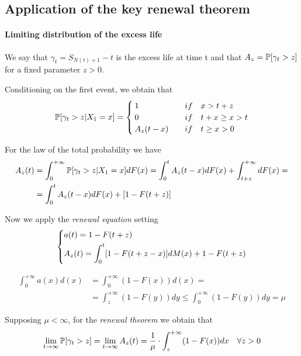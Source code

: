 \subsection{Application of the key renewal theorem}

\paragraph{Limiting distribution of the excess life}

We say that $\gamma_{t}=S_{N(t)+1}-t$ is the excess life at time t and that $A_z=\mathbb{P}[\gamma_t>z]$ for a fixed parameter $z>0$.

Conditioning on the first event, we obtain that
\begin{equation*}
	\mathbb{P}[\gamma_t>z|X_1=x] = \begin{cases}
		1 \quad & if \quad x > t+z \\
		0 \quad & if \quad t+x \geq x > t \\
		A_z(t-x) \quad & if \quad t \geq x > 0
	\end{cases}
\end{equation*}

For the law of the total probability we have
\begin{align*}
	A_z(t) &= \int_{0}^{+\infty} \mathbb{P}[\gamma_t>z|X_1=x] dF(x) = \int_{0}^{t}A_z(t-x)dF(x)+\int_{t+z}^{+\infty}dF(x)= \\
	&= \int_{0}^{t}A_z(t-x)dF(x)+ [1-F(t+z)]
\end{align*}

Now we apply the \textit{renewal equation} setting
\begin{equation} \begin{dcases}
	a(t) = 1 - F(t+z) \\
	A_z(t)=\int_{0}^{t} [1-F(t+z-x)] dM(x)+1-F(t+z)
\end{dcases} \end{equation}

\begin{align*}
	\int_{0}^{+\infty} a(x) d(x) & = \int_{0}^{+\infty}(1-F(x)) d(x) = \\
	& = \int_{z}^{+\infty}(1-F(y))dy \leq \int_{0}^{+\infty}(1-F(y))dy = \mu
\end{align*}

Supposing $\mu < \infty$, for the \textit{renewal theorem} we obtain that
\begin{equation}
	\lim_{t \rightarrow \infty} \mathbb{P}[\gamma_t>z] = \lim_{t \rightarrow \infty} A_z(t) = \frac{1}{\mu} \cdot \int_z^{+\infty}(1-F(x))dx \quad \forall z > 0
	\label{limitingdistribution}
\end{equation}

